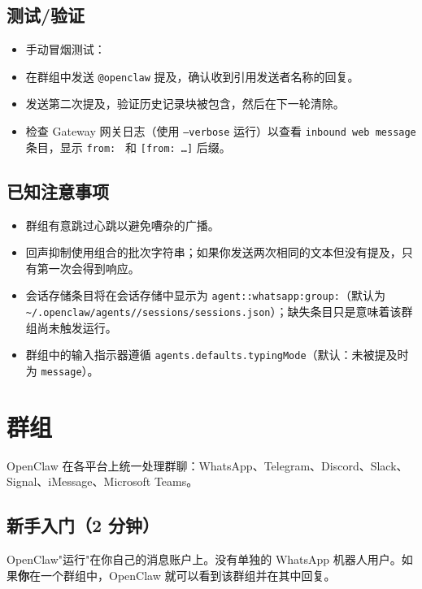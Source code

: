 \subsection{测试/验证}


\begin{itemize}
  \item 手动冒烟测试：
  \item 在群组中发送 \texttt{@openclaw} 提及，确认收到引用发送者名称的回复。
  \item 发送第二次提及，验证历史记录块被包含，然后在下一轮清除。
  \item 检查 Gateway 网关日志（使用 \texttt{--verbose} 运行）以查看 \texttt{inbound web message} 条目，显示 \texttt{from: } 和 \texttt{[from: …]} 后缀。
\end{itemize}


\subsection{已知注意事项}


\begin{itemize}
  \item 群组有意跳过心跳以避免嘈杂的广播。
  \item 回声抑制使用组合的批次字符串；如果你发送两次相同的文本但没有提及，只有第一次会得到响应。
  \item 会话存储条目将在会话存储中显示为 \texttt{agent::whatsapp:group:}（默认为 \texttt{\textasciitilde{}/.openclaw/agents//sessions/sessions.json}）；缺失条目只是意味着该群组尚未触发运行。
  \item 群组中的输入指示器遵循 \texttt{agents.defaults.typingMode}（默认：未被提及时为 \texttt{message}）。
\end{itemize}



\clearpage

\section{群组}


OpenClaw 在各平台上统一处理群聊：WhatsApp、Telegram、Discord、Slack、Signal、iMessage、Microsoft Teams。

\subsection{新手入门（2 分钟）}


OpenClaw"运行"在你自己的消息账户上。没有单独的 WhatsApp 机器人用户。如果\textbf{你}在一个群组中，OpenClaw 就可以看到该群组并在其中回复。

